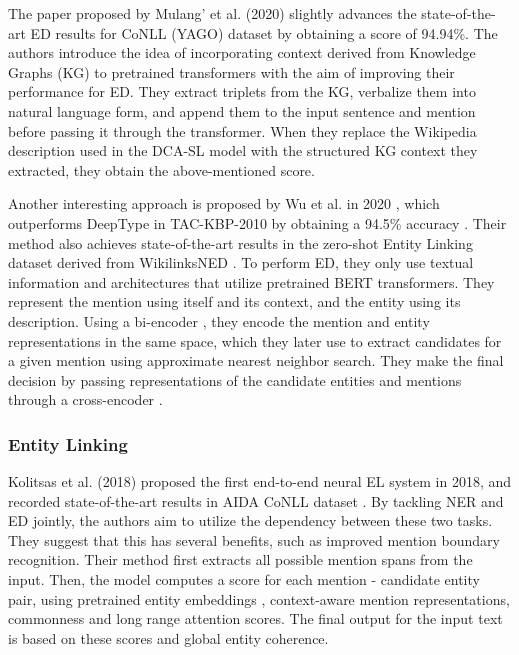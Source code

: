 \documentclass{report}
\theoremstyle{definition}
\theoremstyle{remark}
\begin{document}
The paper proposed by Mulang' et al. (2020) \cite{mulang} slightly advances the state-of-the-art ED results for CoNLL (YAGO) \cite{CoNLLYago} dataset by obtaining a score of 94.94\%. The authors introduce the idea of incorporating context derived from Knowledge Graphs (KG) to pretrained transformers with the aim of improving their performance for ED. They extract triplets from the KG, verbalize them into natural language form, and append them to the input sentence and mention before passing it through the transformer. When they replace the Wikipedia description used in the DCA-SL model \cite{dca} with the structured KG context they extracted, they obtain the above-mentioned score. 

Another interesting approach is proposed by Wu et al. in 2020 \cite{scalablezeroshot}, which outperforms DeepType \cite{raiman} in TAC-KBP-2010 by obtaining a 94.5\% accuracy . Their method also achieves state-of-the-art results in the zero-shot Entity Linking dataset derived from WikilinksNED \cite{wikilinksned}. To perform ED, they only use textual information and architectures that utilize pretrained BERT \cite{BERT} transformers. They represent the mention using itself and its context, and the entity using its description. Using a bi-encoder \cite{polyencoders}, they encode the mention and entity representations in the same space, which they later use to extract candidates for a given mention using approximate nearest neighbor search. They make the final decision by passing representations of the candidate entities and mentions through a cross-encoder \cite{polyencoders}. 

\subsubsection{Entity Linking}
Kolitsas et al. (2018) \cite{kolitsas} proposed the first end-to-end neural EL system in 2018, and recorded state-of-the-art results in AIDA CoNLL dataset \cite{CoNLLYago}. By tackling NER and ED jointly, the authors aim to utilize the dependency between these two tasks. They suggest that this has several benefits, such as improved mention boundary recognition. Their method first extracts all possible mention spans from the input. Then, the model computes a score for each mention - candidate entity pair, using pretrained entity embeddings \cite{kolitsasEmbed}, context-aware mention representations, commonness and long range attention scores. The final output for the input text is based on these scores and global entity coherence. 
\end{document}

